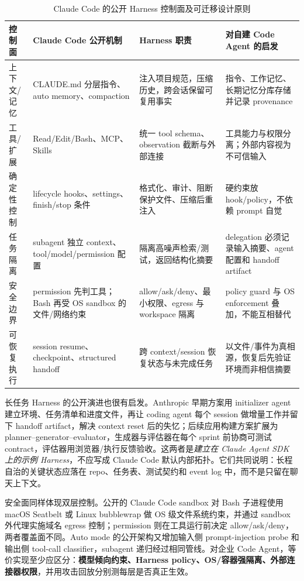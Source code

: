\documentclass[10pt,a4paper,UTF8,fontset=none]{ctexart}
\newcommand{\ident}[1]{{\rmfamily #1}}
\begin{document}
\begin{table}[htbp]
\centering
\caption{Claude Code 的公开 Harness 控制面及可迁移设计原则}
\label{tab:claude-code-public-architecture}
\small
\begin{tabularx}{\textwidth}{p{2.4cm}p{4.2cm}Y Y}
\toprule
控制面 & Claude Code 公开机制 & Harness 职责 & 对自建 Code Agent 的启发 \\
\midrule
上下文/记忆 & \ident{CLAUDE.md} 分层指令、auto memory、compaction & 注入项目规范，压缩历史，跨会话保留可复用事实 & 指令、工作记忆、长期记忆分库存储并记录 provenance\cite{claudecodememory2026} \\
工具/扩展 & Read/Edit/Bash、MCP、Skills & 统一 tool schema、observation 截断与外部连接 & 工具能力与权限分离；外部内容视为不可信输入 \\
确定性控制 & lifecycle hooks、settings、finish/stop 条件 & 格式化、审计、阻断保护文件、压缩后重注入 & 硬约束放 hook/policy，不依赖 prompt 自觉\cite{claudecodehooks2026} \\
任务隔离 & subagent 独立 context、tool/model/permission 配置 & 隔离高噪声检索/测试，返回结构化摘要 & delegation 必须记录输入摘要、agent 配置和 handoff artifact\cite{claudecodesubagents2026} \\
安全边界 & permission 先判工具；Bash 再受 OS sandbox 的文件/网络约束 & allow/ask/deny、最小权限、egress 与 workspace 隔离 & policy guard 与 OS enforcement 叠加，不能互相替代\cite{claudecodesandbox2026} \\
可恢复执行 & session resume、checkpoint、structured handoff & 跨 context/session 恢复状态与未完成任务 & 以文件/事件为真相源，恢复后先验证环境而非相信摘要 \\
\bottomrule
\end{tabularx}
\end{table}

长任务 Harness 的公开演进也很有启发。Anthropic 早期方案用 initializer agent 建立环境、任务清单和进度文件，再让 coding agent 每个 session 做增量工作并留下 handoff artifact，解决 context reset 后的失忆\cite{anthropic2025longharness}；后续应用构建方案扩展为 planner--generator--evaluator，生成器与评估器在每个 sprint 前协商可测试 contract，评估器用浏览器/执行反馈验收\cite{anthropic2026harnessdesign}。这两者是\emph{建立在 Claude Agent SDK 上的示例 Harness}，不应写成 Claude Code 默认内部拓扑。它们共同说明：长程自治的关键状态应落在 repo、任务表、测试契约和 event log 中，而不是只留在聊天上下文。

安全面同样体现双层控制。公开的 Claude Code sandbox 对 Bash 子进程使用 macOS Seatbelt 或 Linux bubblewrap 做 OS 级文件系统约束，并通过 sandbox 外代理实施域名 egress 控制；permission 则在工具运行前决定 allow/ask/deny，两者覆盖面不同\cite{claudecodesandbox2026}。Auto mode 的公开架构又增加输入侧 prompt-injection probe 和输出侧 tool-call classifier，subagent 递归经过相同管线\cite{anthropic2026automode}。对企业 Code Agent，等价实现至少应区分：\textbf{模型倾向约束、Harness policy、OS/容器强隔离、外部连接器权限}，并用攻击回放分别测每层是否真正生效。
\end{document}
